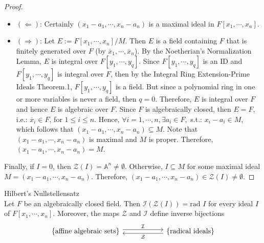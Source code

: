 \begin{proof}
    \begin{itemize}
        \item $(\Leftarrow)$: Certainly $(x_1-a_1 ,\cdots, x_n-a_n)$ is a maximal ideal in $F[x_1 ,\cdots, x_n]$.

        \item $(\Rightarrow)$: Let $E:= F[x_1 ,\cdots, x_n] /M$. Then $E$ is a field containing $F$ that is finitely generated over $F$ (by $\overline{x}_1 ,\cdots, \overline{x}_n$). By the Noetherian's Normalization Lemma, $E$ is integral over $F[y_1 ,\cdots, y_q]$. Since $F[y_1 ,\cdots, y_q]$ is an ID and $F[y_1 ,\cdots, y_q]$ is integral over $F$, then by the Integral Ring Extension-Prime Ideals Theorem.1, $F[y_1 ,\cdots, y_q]$ is a field. But since a polynomial ring in one or more variables is never a field, then $q=0$. Therefore, $E$ is integral over $F$ and hence $E$ is algebraic over $F$. Since $F$ is algebraically closed, then $E=F$, i.e.: $\overline{x}_i \in F$, for $1\leq i\leq n$. Hence, $\forall i=1,\cdots, n, \exists a_i\in F,$ s.t.: $x_i-a_i \in M$, which follows that $(x_1-a_1 ,\cdots, x_n-a_n) \subseteq M$. Note that $(x_1-a_1 ,\cdots, x_n-a_n)$ is maximal and $M$ is proper. Therefore, $(x_1-a_1 ,\cdots, x_n-a_n) =M$.
    \end{itemize}
    Finally, if $I=0$, then $\mathcal{Z} (I)= \mathbb{A}^n \neq \emptyset$. Otherwise, $I \subseteq M$ for some maximal ideal $M=(x_1-a_1 ,\cdots, x_n-a_n)$. Therefore, $(x_1-a_1 ,\cdots, x_n-a_n) \in \mathcal{Z} (I) \neq \emptyset$.
\end{proof}


\begin{theorem}{Hilbert's Nullstellensatz}\\
Let $F$ be an algebraically closed field. Then $\mathcal{I}( \mathcal{Z} (I)) =\text{rad }I$ for every ideal $I$ of $F[x_1 ,\cdots, x_n]$. Moreover, the maps $\mathcal{Z}$ and $\mathcal{I}$ define inverse bijections
\[
\begin{tikzcd}[column sep=2cm]
    \{ \text{affine algebraic sets}\} \arrow[r, shift left=0.6ex, "\mathcal{I}"] & \{ \text{radical ideals} \} \arrow[l, shift left=0.6ex, "\mathcal{Z}"]
\end{tikzcd}
\]
\end{theorem}

